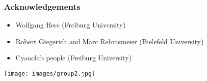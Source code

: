 \documentclass[ignorenonframetext,10pt]{beamer}
\begin{document}
\frame
{
        \frametitle{\large Acknowledgements}
        \begin{itemize}
                \item Wolfgang Hess (Freiburg University)
                \item Robert Giegerich and Marc Rehmsmeier (Bielefeld University)
                \item Cyanolab people (Freiburg University)
        \end{itemize}
        \begin{center}
        \texttt{[image: images/group2.jpg]}
        \end{center}
}

\end{document}
